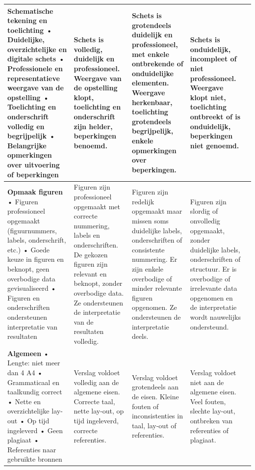 \documentclass{article}
\begin{document}
\begin{landscape}
\begin{longtable}{p{7cm}|p{5cm}|p{5cm}|p{5cm}|p{1cm}}
\textbf{Schematische tekening en toelichting} \newline
• Duidelijke, overzichtelijke en digitale schets \newline
• Professionele en representatieve weergave van de opstelling \newline
• Toelichting en onderschrift volledig en begrijpelijk \newline
• Belangrijke opmerkingen over uitvoering of beperkingen
&
Schets is volledig, duidelijk en professioneel. Weergave van de opstelling klopt, toelichting en onderschrift zijn helder, beperkingen benoemd.
&
Schets is grotendeels duidelijk en professioneel, met enkele ontbrekende of onduidelijke elementen. Weergave herkenbaar, toelichting grotendeels begrijpelijk, enkele opmerkingen over beperkingen.
&
Schets is onduidelijk, incompleet of niet professioneel. Weergave klopt niet, toelichting ontbreekt of is onduidelijk, beperkingen niet genoemd.
& \\
\hline


\textbf{Opmaak figuren} \newline
• Figuren professioneel opgemaakt (figuurnummers, labels, onderschrift, etc.) \newline
• Goede keuze in figuren en beknopt, geen overbodige data gevisualiseerd \newline
• Figuren en onderschriften ondersteunen interpretatie van resultaten
&
Figuren zijn professioneel opgemaakt met correcte nummering, labels en onderschriften. De gekozen figuren zijn relevant en beknopt, zonder overbodige data. Ze ondersteunen de interpretatie van de resultaten volledig.
&
Figuren zijn redelijk opgemaakt maar missen soms duidelijke labels, onderschriften of consistente nummering. Er zijn enkele overbodige of minder relevante figuren opgenomen. Ze ondersteunen de interpretatie deels.
&
Figuren zijn slordig of onvolledig opgemaakt, zonder duidelijke labels, onderschriften of structuur. Er is overbodige of irrelevante data opgenomen en de interpretatie wordt nauwelijks ondersteund.
& \\
\hline


\textbf{Algemeen} \newline
• Lengte: niet meer dan 4 A4 \newline
• Grammaticaal en taalkundig correct \newline
• Nette en overzichtelijke lay-out \newline
• Op tijd ingeleverd \newline
• Geen plagiaat \newline
• Referenties naar gebruikte bronnen
&
Verslag voldoet volledig aan de algemene eisen. Correcte taal, nette lay-out, op tijd ingeleverd, correcte referenties.
&
Verslag voldoet grotendeels aan de eisen. Kleine fouten of inconsistenties in taal, lay-out of referenties.
&
Verslag voldoet niet aan de algemene eisen. Veel fouten, slechte lay-out, ontbreken van referenties of plagiaat.
& \\
\hline

\end{longtable}

\end{landscape}
\end{document}
